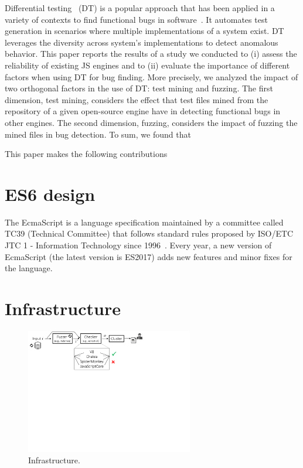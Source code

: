 \documentclass[10pt,conference,anonymous]{IEEEtran}
\begin{document}
Differential testing~\cite{Brumley-etal-ss07} (DT) is a popular
approach that has been applied in a variety of contexts to find
functional bugs in
software~\cite{Yang-etal-pldi11,Chen-etal-fse2015,Argyros-etla-ccs16,Chen-etal-pldi16,petsios-etal-sp2017,SivakornAPKJ17}. It
automates test generation in scenarios where multiple implementations
of a system exist. DT leverages the diversity across system's
implementations to detect anomalous behavior.
This paper reports the results of a study we conducted to (i) assess
the reliability of existing JS engines and to (ii) evaluate the
importance of different factors when using DT for bug finding. More
precisely, we analyzed the impact of two orthogonal factors in the use
of DT: test mining and fuzzing. The first dimension, test mining,
considers the effect that \js{} test files mined from the repository
of a given open-source engine have in detecting functional bugs in
other engines. The second dimension, fuzzing, considers the impact of
fuzzing the mined files in bug detection.
To sum, we found that 

This paper makes the following contributions 

\section{ES6 design}
\label{sec:es6-design}
The EcmaScript is a language specification maintained by 
a committee called TC39 (Technical Committee) that follows 
standard rules proposed by ISO/ETC JTC 1 - 
Information Technology since 1996~\cite{es6-website}.
Every year, a new version of EcmaScript (the latest version is ES2017) adds
new features and minor fixes for the language. 

\section{Infrastructure}
\label{sec:design}


\begin{figure}[t]
  \centering
  \includegraphics[trim=0 350 0 0,clip,width=0.65\textwidth]{diff-testing-runtimes}
  \caption{\label{fig:workflow}Infrastructure.}
\end{figure}
\end{document}
